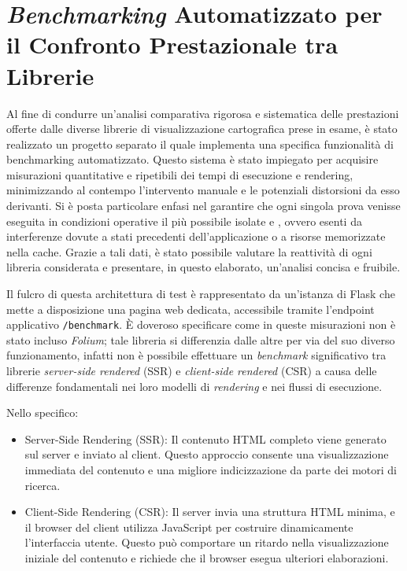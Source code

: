 \section{\textit{Benchmarking} Automatizzato per il Confronto Prestazionale tra Librerie}

Al fine di condurre un'analisi comparativa rigorosa e sistematica delle prestazioni offerte dalle diverse librerie di visualizzazione cartografica prese in esame, è stato realizzato un progetto separato il quale implementa una specifica funzionalità di benchmarking automatizzato. Questo sistema è stato impiegato per acquisire misurazioni quantitative e ripetibili dei tempi di esecuzione e rendering, minimizzando al contempo l'intervento manuale e le potenziali distorsioni da esso derivanti. Si è posta particolare enfasi nel garantire che ogni singola prova venisse eseguita in condizioni operative il più possibile isolate e , ovvero esenti da interferenze dovute a stati precedenti dell'applicazione o a risorse memorizzate nella cache.
Grazie a tali dati, è stato possibile valutare la reattività di ogni libreria considerata e presentare, in questo elaborato, un'analisi concisa e fruibile.

Il fulcro di questa architettura di test è rappresentato da un'istanza di Flask che mette a disposizione una pagina web dedicata, accessibile tramite l'endpoint applicativo \texttt{/benchmark}. 
È doveroso specificare come in queste misurazioni non è stato incluso \textit{Folium}; tale libreria si differenzia dalle altre per via del suo diverso funzionamento, infatti non è possibile effettuare un \textit{benchmark} significativo tra librerie \textit{server-side rendered} (SSR) e \textit{client-side rendered} (CSR) a causa delle differenze fondamentali nei loro modelli di \textit{rendering} e nei flussi di esecuzione. 

Nello specifico:
\begin{itemize}
      \item Server-Side Rendering (SSR): Il contenuto HTML completo viene generato sul server e inviato al client. Questo approccio consente una visualizzazione immediata del contenuto e una migliore indicizzazione da parte dei motori di ricerca.\cite{peerdh-ssr-csr-comparison}

    \item Client-Side Rendering (CSR): Il server invia una struttura HTML minima, e il browser del client utilizza JavaScript per costruire dinamicamente l'interfaccia utente. Questo può comportare un ritardo nella visualizzazione iniziale del contenuto e richiede che il browser esegua ulteriori elaborazioni.\cite{devto-csr-vs-ssr}
\end{itemize}
  

